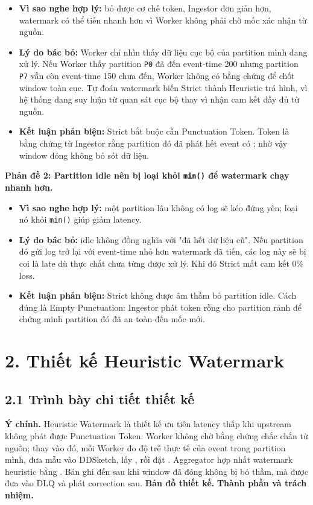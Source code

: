 \documentclass[12pt,a4paper]{article}
\begin{document}
\begin{itemize}
\item \textbf{Vì sao nghe hợp lý:} bỏ được cơ chế token, Ingestor đơn giản hơn, watermark có thể tiến nhanh hơn vì Worker không phải chờ mốc xác nhận từ nguồn.
\item \textbf{Lý do bác bỏ:} Worker chỉ nhìn thấy dữ liệu cục bộ của partition mình đang xử lý. Nếu Worker thấy partition \texttt{P0} đã đến event-time 200 nhưng partition \texttt{P7} vẫn còn event-time 150 chưa đến, Worker không có bằng chứng để chốt window toàn cục. Tự đoán watermark biến Strict thành Heuristic trá hình, vì hệ thống đang suy luận từ quan sát cục bộ thay vì nhận cam kết đầy đủ từ nguồn.
\item \textbf{Kết luận phản biện:} Strict bắt buộc cần Punctuation Token. Token là bằng chứng từ Ingestor rằng partition đó đã phát hết event có ; nhờ vậy window đóng không bỏ sót dữ liệu.
\end{itemize}
\textbf{Phản đề 2: Partition idle nên bị loại khỏi \texttt{min()} để watermark chạy nhanh hơn.}

\begin{itemize}
\item \textbf{Vì sao nghe hợp lý:} một partition lâu không có log sẽ kéo  đứng yên; loại nó khỏi \texttt{min()} giúp giảm latency.
\item \textbf{Lý do bác bỏ:} idle không đồng nghĩa với "đã hết dữ liệu cũ". Nếu partition đó gửi log trở lại với event-time nhỏ hơn watermark đã tiến, các log này sẽ bị coi là late dù thực chất chưa từng được xử lý. Khi đó Strict mất cam kết 0\% loss.
\item \textbf{Kết luận phản biện:} Strict không được âm thầm bỏ partition idle. Cách đúng là Empty Punctuation: Ingestor phát token rỗng cho partition rảnh để chứng minh partition đó đã an toàn đến mốc mới.
\end{itemize}

\section{2. Thiết kế Heuristic Watermark}
\label{sec:heuristic-watermark}

\subsection{2.1 Trình bày chi tiết thiết kế}
\textbf{Ý chính.} Heuristic Watermark là thiết kế ưu tiên latency thấp khi upstream không phát được Punctuation Token. Worker không chờ bằng chứng chắc chắn từ nguồn; thay vào đó, mỗi Worker đo độ trễ thực tế của event trong partition mình, đưa mẫu vào DDSketch, lấy , rồi đặt . Aggregator hợp nhất watermark heuristic bằng . Bản ghi đến sau khi window đã đóng không bị bỏ thầm, mà được đưa vào DLQ và phát correction sau.
\textbf{Bản đồ thiết kế.}
\textbf{Thành phần và trách nhiệm.}
\end{document}
